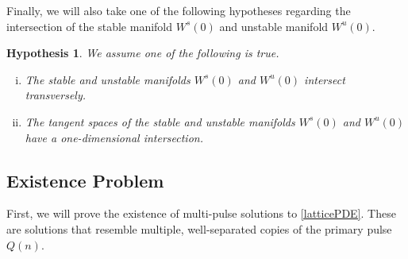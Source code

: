 \documentclass[12pt]{article}
\newtheorem{hypothesis}{Hypothesis}
\begin{document}
Finally, we will also take one of the following hypotheses regarding the intersection of the stable manifold $W^s(0)$ and unstable manifold $W^u(0)$.
\begin{hypothesis}\label{intersectionhyp}
We assume one of the following is true.
\begin{enumerate}[(i)]
\item The stable and unstable manifolds $W^s(0)$ and $W^u(0)$ intersect transversely.
\item The tangent spaces of the stable and unstable manifolds $W^s(0)$ and $W^u(0)$ have a one-dimensional intersection. 
\end{enumerate}
\end{hypothesis}

\subsection{Existence Problem}
First, we will prove the existence of multi-pulse solutions to \eqref{latticePDE}. These are solutions that resemble multiple, well-separated copies of the primary pulse $Q(n)$.
\end{document}
